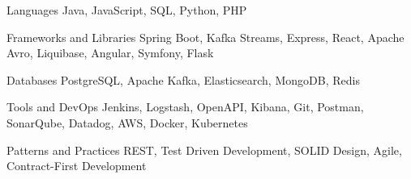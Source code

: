 
\begin{cvskills}

  \cvskill
    {Languages} %
    {Java, JavaScript, SQL, Python, PHP} %

  \cvskill
    {Frameworks  and Libraries} %
    {Spring Boot, Kafka Streams, Express, React, Apache Avro, Liquibase,
    Angular, Symfony, Flask} %

  \cvskill
    {Databases} %
    {PostgreSQL, Apache Kafka, Elasticsearch, MongoDB, Redis} %

  \cvskill
    {Tools and DevOps} %
    {Jenkins, Logstash, OpenAPI, Kibana, Git, Postman, SonarQube, Datadog, AWS,
    Docker, Kubernetes} %

  \cvskill
    {Patterns and Practices} %
    {REST, Test Driven Development, SOLID Design, Agile, Contract-First
    Development} %
\end{cvskills}
